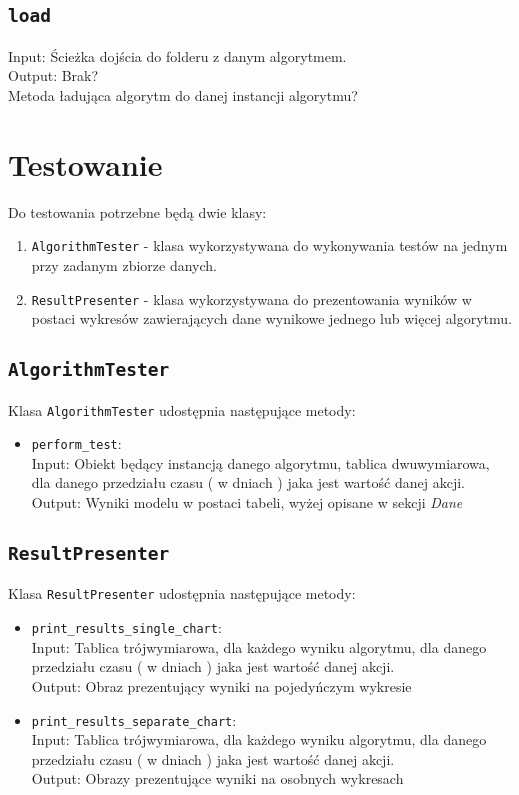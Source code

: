 \documentclass[polish,envcountsect,10pt]{article}
\begin{document}
\subsection{\texttt{load}}
Input: Ścieżka dojścia do folderu z danym algorytmem.\\
Output: Brak?\\
Metoda ładująca algorytm do danej instancji algorytmu?

\section{Testowanie}
Do testowania potrzebne będą dwie klasy:
\begin{enumerate}
    \item \texttt{AlgorithmTester} - klasa wykorzystywana do wykonywania testów na jednym przy zadanym zbiorze danych.
    \item \texttt{ResultPresenter} - klasa wykorzystywana do prezentowania wyników w postaci wykresów zawierających dane wynikowe jednego lub więcej algorytmu.
\end{enumerate}

\subsection{\texttt{AlgorithmTester}}
Klasa \texttt{AlgorithmTester} udostępnia następujące metody:
\begin{itemize}
    \item \texttt{perform\_test}:\\
        Input: Obiekt będący instancją danego algorytmu, tablica dwuwymiarowa, dla danego przedziału czasu ( w dniach ) jaka jest wartość danej akcji.\\
        Output: Wyniki modelu w postaci tabeli, wyżej opisane w sekcji \emph{Dane} 
\end{itemize} 
\subsection{\texttt{ResultPresenter}}
Klasa \texttt{ResultPresenter} udostępnia następujące metody:
\begin{itemize}
    \item \texttt{print\_results\_single\_chart}:\\
        Input: Tablica trójwymiarowa, dla każdego wyniku algorytmu, dla danego przedziału czasu ( w dniach ) jaka jest wartość danej akcji.\\
        Output: Obraz prezentujący wyniki na pojedyńczym wykresie
        \item \texttt{print\_results\_separate\_chart}:\\
            Input: Tablica trójwymiarowa, dla każdego wyniku algorytmu, dla danego przedziału czasu ( w dniach ) jaka jest wartość danej akcji.\\
            Output: Obrazy prezentujące wyniki na osobnych wykresach  
\end{itemize} 
\end{document}
